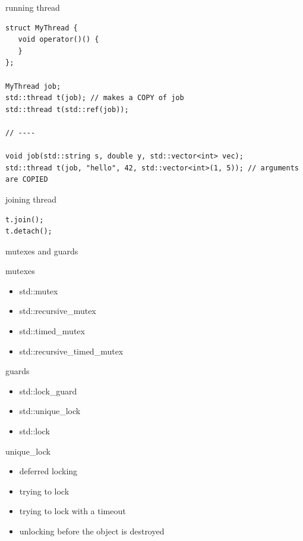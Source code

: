 \documentclass{beamer}
\begin{document}
\begin{frame}{running thread}
\begin{block}{}
\begin{verbatim}
struct MyThread {
   void operator()() {
   }
};

MyThread job;
std::thread t(job); // makes a COPY of job
std::thread t(std::ref(job));

// ----

void job(std::string s, double y, std::vector<int> vec);
std::thread t(job, "hello", 42, std::vector<int>(1, 5)); // arguments are COPIED

\end{verbatim}
\end{block}
\end{frame}

\begin{frame}{joining thread}
\begin{block}{}
\begin{verbatim}
t.join();
t.detach();

\end{verbatim}
\end{block}
\end{frame}

\begin{frame}{mutexes and guards}
  \begin{block}{mutexes}
    \begin{itemize}
    \item std::mutex
    \item std::recursive\_mutex
    \item std::timed\_mutex
    \item std::recursive\_timed\_mutex
    \end{itemize}
  \end{block}

  \begin{block}{guards}
    \begin{itemize}
    \item std::lock\_guard
    \item std::unique\_lock
    \item std::lock
    \end{itemize}
  \end{block}

  \begin{block}{unique\_lock}
    \begin{itemize}
    \item deferred locking
    \item trying to lock
    \item trying to lock with a timeout
    \item unlocking before the object is destroyed
    \end{itemize}
  \end{block}
\end{frame}
\end{document}
